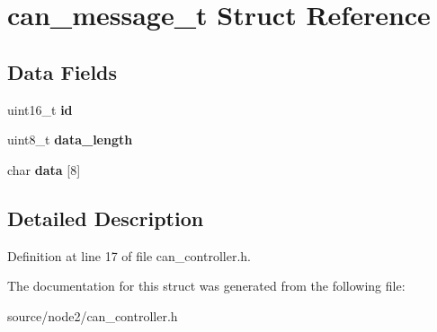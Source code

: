 \hypertarget{structcan__message__t}{}\section{can\+\_\+message\+\_\+t Struct Reference}
\label{structcan__message__t}
\subsection*{Data Fields}
\begin{DoxyCompactItemize}
\item 
\mbox{\label{structcan__message__t_ac5d7e171bc59d6e5ead8957faa1259a6}} 
uint16\+\_\+t {\bfseries id}
\item 
\mbox{\label{structcan__message__t_a9fe78331fe613c59c9cbe098d046b2a8}} 
uint8\+\_\+t {\bfseries data\+\_\+length}
\item 
\mbox{\label{structcan__message__t_a519019132ffdcd9fe783b12c4f280c57}} 
char {\bfseries data} \mbox{[}8\mbox{]}
\end{DoxyCompactItemize}


\subsection{Detailed Description}


Definition at line 17 of file can\+\_\+controller.\+h.



The documentation for this struct was generated from the following file\+:\begin{DoxyCompactItemize}
\item 
source/node2/can\+\_\+controller.\+h\end{DoxyCompactItemize}
